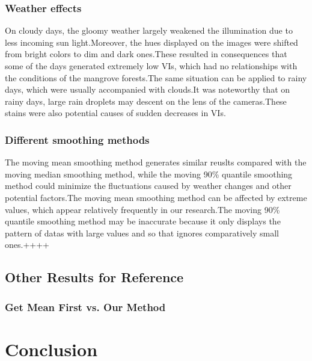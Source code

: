 \documentclass{article}
\begin{document}
\subsubsection{Weather effects}
On cloudy days, the gloomy weather largely weakened the illumination due to less incoming sun light.Moreover, the hues displayed on the images were shifted from bright colors to dim and dark ones.These resulted in consequences that some of the days generated extremely low VIs, which had no relationships with the conditions of the mangrove forests.The same situation can be applied to rainy days, which were usually accompanied with clouds.It was noteworthy that on rainy days, large  rain droplets may descent on the lens of the cameras.These stains were also potential causes of sudden decreases in VIs.


\subsubsection{Different smoothing methods}
The moving mean smoothing method generates similar reuslts compared with the moving median smoothing method, while the moving 90\% quantile smoothing method could minimize the fluctuations caused by weather changes and other potential factors.The moving mean smoothing method can be affected by extreme values, which appear relatively frequently in our research.The moving 90\% quantile smoothing method may be inaccurate because it only displays the pattern of datas with large values and so that ignores comparatively small ones.++++ 



\subsection{Other Results for Reference}
\subsubsection{Get Mean First vs. Our Method}



\section{Conclusion}



  
\end{document}
